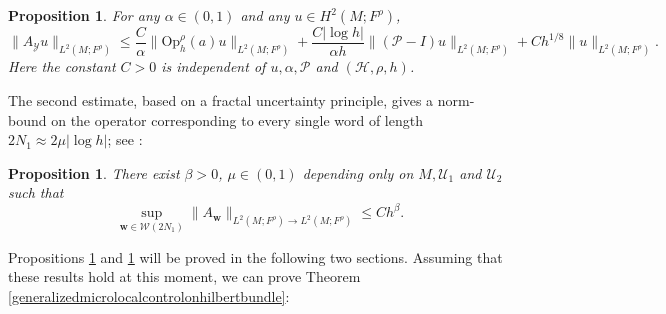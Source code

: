 \documentclass[11pt,oneside,reqno]{amsart}
\newtheorem{proposition}[theorem]{Proposition}
\theoremstyle{definition}
\numberwithin{equation}{section}
\theoremstyle{plain}
\begin{document}
\begin{proposition}\label{controlwordpart}
For any $\alpha \in (0,1)$ and any $u \in H^2(M;F^{\rho})$,
\begin{equation*}
    \|A_{\mathcal{Y}} u\|_{L^2(M;F^\rho) } \leq \frac{C}{\alpha}\|\mathrm{Op}_h^{\rho}(a) u\|_{L^2(M;F^\rho) }+\frac{C |\log h|}{\alpha h}\|(\mathcal{P}-I) u\|_{L^2(M;F^\rho) }+Ch^{1/8}\|u\|_{L^2(M;F^\rho) } .
\end{equation*}
Here the constant $C>0$ is independent of $u,\alpha,\mathcal{P}$ and $(\mathcal{H},\rho,h)$.
\end{proposition}


The second estimate, based on a fractal uncertainty principle, gives a norm-bound on the operator corresponding to every single word of length $2 N_1 \approx 2 \mu |\log h|$; see \cite[Proposition 3.5]{dyatlov2018semiclassical}:


\begin{proposition}\label{uncontrolwordpart}
There exist $\beta>0$, $\mu \in(0,1)$ depending only on $M, \mathcal{U}_1$ and $ \mathcal{U}_2$ such that
\begin{equation*}
    \sup _{\mathbf{w} \in \mathcal{W}(2 N_1)}\|A_{\mathbf{w}}\|_{L^2(M;F^\rho) \rightarrow L^2(M;F^\rho)} \leq C h^\beta.
\end{equation*}
\end{proposition}

Propositions \ref{controlwordpart} and \ref{uncontrolwordpart} will be proved in the following two sections. Assuming that these results hold at this moment, we can prove Theorem \ref{generalizedmicrolocalcontrolonhilbertbundle}:

\vspace{.1cm}
\end{document}
